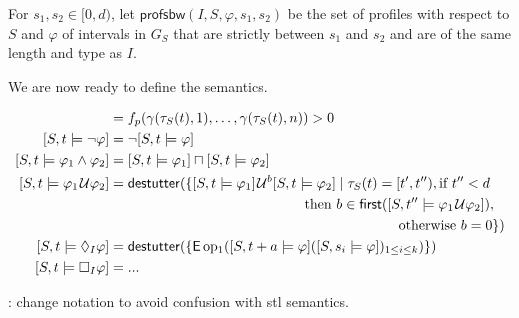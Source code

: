 For $s_1, s_2 \in [0,d)$, let $\mathsf{profsbw}(I, S, \varphi, s_1, s_2)$ be the set of profiles with respect to $S$ and $\varphi$ of intervals in $G_S$ that are strictly between $s_1$ and $s_2$ and are of the same length and type as $I$.

We are now ready to define the semantics.

\begin{align*}
	[S,t \models p] &=  f_p(\gamma(\tau_S(t), 1), \ldots, \gamma(\tau_S(t), n)) > 0 \\
	[S,t \models \lnot \varphi] &= \lnot [S,t \models \varphi] \\
	[S,t \models \varphi_1 \land \varphi_2] &= [S,t \models \varphi_1] \sqcap [S,t \models \varphi_2] \\
	[S,t \models \varphi_1 \until \varphi_2] &= \destutter(\{ [S,t \models \varphi_1] \until^b [S,t \models \varphi_2] \st \tau_S(t) = [t',t''), \text{if $t'' < d$} \\
	&\hspace{14em} \text{then } b \in \first([S,t'' \models \varphi_1 \until \varphi_2]), \\
	&\hspace{20.75em} \text{otherwise } b = 0 \}) \\
	[S,t \models \LTLf_I \varphi] &= \destutter(\{ \mathsf{E} \operatorname{op_1}([S,t+a \models \varphi] ([S, s_i \models \varphi])_{1 \leq i \leq k})  \}) \\
	[S,t \models \LTLg_I \varphi] &= ...
\end{align*}

\TODO: change notation to avoid confusion with stl semantics.


